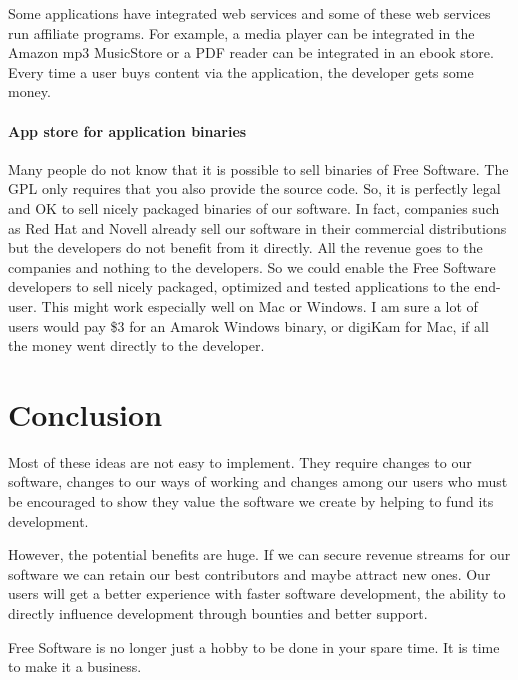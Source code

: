 Some applications have integrated web services and some of these web services
run affiliate programs. For example, a media player can be integrated in the
Amazon mp3 MusicStore or a PDF reader can be integrated in an ebook store.
Every time a user buys content via the application, the developer gets some
money.

\paragraph*{App store for application binaries}

Many people do not know that it is possible to sell binaries of Free Software.
The GPL only requires that you also provide the source code. So, it is perfectly
legal and OK to sell nicely packaged binaries of our software. In fact,
companies such as Red Hat and Novell already sell our software in their commercial distributions but the developers do not benefit from it directly. All the revenue goes to the companies and nothing to the developers. So we could enable the Free Software developers to sell nicely packaged, optimized and
tested applications to the end-user. This might work especially well on Mac or
Windows. I am sure a lot of users would pay \$3 for an Amarok Windows binary, or
digiKam for Mac, if all the money went directly to the developer.

\section*{Conclusion}

Most of these ideas are not easy to implement. They require changes to our
software, changes to our ways of working and changes among our users who must be
encouraged to show they value the software we create by helping to fund its
development.

However, the potential benefits are huge. If we can secure revenue streams for
our software we can retain our best contributors and maybe attract new ones. Our
users will get a better experience with faster software development, the ability
to directly influence development through bounties and better support.

Free Software is no longer just a hobby to be done in your spare time. It is
time to make it a business.
